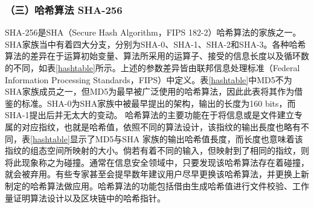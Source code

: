 				\subsubsection{（三）哈希算法 SHA-256}
				SHA-256是SHA（Secure Hash Algorithm，FIPS 182-2）\supercite{DBLP:conf/fse/KhovratovichRS12}哈希算法的家族之一。SHA家族当中有着四大分支，分别为SHA-0、SHA-1、SHA-2和SHA-3。各种哈希算法的差异在于运算初始变量、算法所采用的运算子、接受的信息长度以及循环数的不同，如表\ref{hashtable}所示。上述的参数差异皆由联邦信息处理标准（Federal Information Processing Standards，FIPS）中定义。表\ref{hashtable}中MD5\supercite{TheMD5message-digestalgorithm}不为SHA家族成员之一，但MD5为最早被广泛使用的哈希算法，因此此表将其作为借鉴的标准。SHA-0为SHA家族中被最早提出的架构，输出的长度为160 bits，而SHA-1提出后并无太大的变动。
				哈希算法的主要功能在于将信息或是文件建⽴专属的对应指纹，也就是哈希值，依照不同的算法设计，该指纹的输出⾧度也略有不同，表\ref{hashtable}显示了MD5与SHA 家族的输出哈希值⾧度，而长度也意味着该指纹的组态空间所映射的大小。倘若有着不同的输入，但映射到了相同的指纹，则将此现象称之为碰撞。通常在信息安全领域中，只要发现该哈希算法存在着碰撞，就会被弃用。有些专家甚⾄会提早数年建议用户尽早更换该哈希算法，并更换上新制定的哈希算法做应⽤。哈希算法的功能包括借由生成哈希值进行文件校验、工作量证明算法设计以及区块链中的哈希指针\supercite{Double-spendAttackModelswithTimeAdvantangeforBitcoin}。

